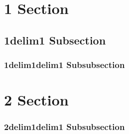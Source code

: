 \hypertarget{sec:section}{%
\section{1 Section}\label{sec:section}}

\hypertarget{sec:subsection}{%
\subsection{1delim1 Subsection}\label{sec:subsection}}

\hypertarget{sec:subsubsection}{%
\subsubsection{1delim1delim1 Subsubsection}\label{sec:subsubsection}}

\hypertarget{sec:section-1}{%
\section{2 Section}\label{sec:section-1}}

\hypertarget{sec:subsubsection-1}{%
\subsubsection{2delim1delim1 Subsubsection}\label{sec:subsubsection-1}}
